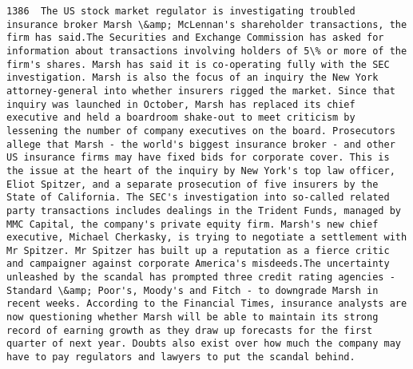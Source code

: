 \documentclass[11pt]{article}
\begin{document}
\begin{Verbatim}[commandchars=\\\{\}]
         1386  The US stock market regulator is investigating troubled insurance broker Marsh \&amp; McLennan's shareholder transactions, the firm has said.The Securities and Exchange Commission has asked for information about transactions involving holders of 5\% or more of the firm's shares. Marsh has said it is co-operating fully with the SEC investigation. Marsh is also the focus of an inquiry the New York attorney-general into whether insurers rigged the market. Since that inquiry was launched in October, Marsh has replaced its chief executive and held a boardroom shake-out to meet criticism by lessening the number of company executives on the board. Prosecutors allege that Marsh - the world's biggest insurance broker - and other US insurance firms may have fixed bids for corporate cover. This is the issue at the heart of the inquiry by New York's top law officer, Eliot Spitzer, and a separate prosecution of five insurers by the State of California. The SEC's investigation into so-called related party transactions includes dealings in the Trident Funds, managed by MMC Capital, the company's private equity firm. Marsh's new chief executive, Michael Cherkasky, is trying to negotiate a settlement with Mr Spitzer. Mr Spitzer has built up a reputation as a fierce critic and campaigner against corporate America's misdeeds.The uncertainty unleashed by the scandal has prompted three credit rating agencies - Standard \&amp; Poor's, Moody's and Fitch - to downgrade Marsh in recent weeks. According to the Financial Times, insurance analysts are now questioning whether Marsh will be able to maintain its strong record of earning growth as they draw up forecasts for the first quarter of next year. Doubts also exist over how much the company may have to pay regulators and lawyers to put the scandal behind.                                                                                                                                                                                                                                                                                                                                                                                                                                                                                                                                                                                                                                                                                                                                                                                                                                                                                                                                                                                                                                                                                                                                                                                                                                                                                                                                                                                                                                                                                                                               
\end{Verbatim}
\end{document}

